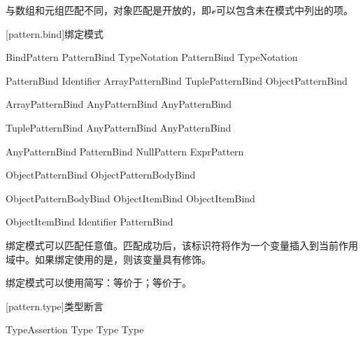 \pnum
与数组和元组匹配不同，对象匹配是开放的，即$\mathcal{v}$可以包含未在模式中列出的项。

[pattern.bind]{绑定模式}

\begin{bnf}{BindPattern}
     PatternBind TypeNotation\bnfq \br
     PatternBind TypeNotation\bnfq
\end{bnf}

\begin{bnf}{PatternBind}
    Identifier \br
    ArrayPatternBind \br
    TuplePatternBind \br
    ObjectPatternBind
\end{bnf}

\begin{bnf}{ArrayPatternBind}
    \terminal{[} AnyPatternBind \bnflp\terminal{,} AnyPatternBind\bnfrp\bnfs \terminal{]}
\end{bnf}

\begin{bnf}{TuplePatternBind}
    \terminal{(} AnyPatternBind \bnflp\terminal{,} AnyPatternBind\bnfrp\bnfs \terminal{)}
\end{bnf}

\begin{bnf}{AnyPatternBind}
    PatternBind \br
     \br
    NullPattern \br
    ExprPattern
\end{bnf}

\begin{bnf}{ObjectPatternBind}
    \terminal{\{} ObjectPatternBodyBind \terminal{\}}
\end{bnf}

\begin{bnf}{ObjectPatternBodyBind}
    ObjectItemBind \bnflp\terminal{,} ObjectItemBind\bnfrp\bnfs
\end{bnf}

\begin{bnf}{ObjectItemBind}
    Identifier \terminal{:} PatternBind
\end{bnf}

\pnum
绑定模式可以匹配任意值。匹配成功后，该标识符将作为一个变量插入到当前作用域中。如果绑定使用的是，则该变量具有修饰。

\pnum
绑定模式可以使用简写：等价于；等价于\tcode{[let i, _]}。

[pattern.type]{类型断言}

\begin{bnf}{TypeAssertion}
     Type \br
    \terminal{:} Type \br
     Type
\end{bnf}

